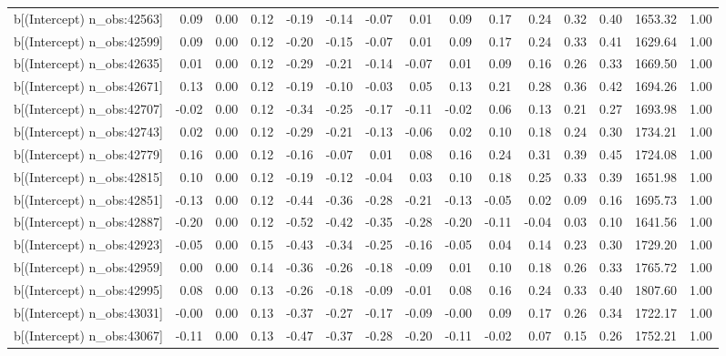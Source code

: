 \begin{table}[ht]
\begin{tabular}{rrrrrrrrrrrrrrr}
  b[(Intercept) n\_obs:42563] & 0.09 & 0.00 & 0.12 & -0.19 & -0.14 & -0.07 & 0.01 & 0.09 & 0.17 & 0.24 & 0.32 & 0.40 & 1653.32 & 1.00 \\ 
  b[(Intercept) n\_obs:42599] & 0.09 & 0.00 & 0.12 & -0.20 & -0.15 & -0.07 & 0.01 & 0.09 & 0.17 & 0.24 & 0.33 & 0.41 & 1629.64 & 1.00 \\ 
  b[(Intercept) n\_obs:42635] & 0.01 & 0.00 & 0.12 & -0.29 & -0.21 & -0.14 & -0.07 & 0.01 & 0.09 & 0.16 & 0.26 & 0.33 & 1669.50 & 1.00 \\ 
  b[(Intercept) n\_obs:42671] & 0.13 & 0.00 & 0.12 & -0.19 & -0.10 & -0.03 & 0.05 & 0.13 & 0.21 & 0.28 & 0.36 & 0.42 & 1694.26 & 1.00 \\ 
  b[(Intercept) n\_obs:42707] & -0.02 & 0.00 & 0.12 & -0.34 & -0.25 & -0.17 & -0.11 & -0.02 & 0.06 & 0.13 & 0.21 & 0.27 & 1693.98 & 1.00 \\ 
  b[(Intercept) n\_obs:42743] & 0.02 & 0.00 & 0.12 & -0.29 & -0.21 & -0.13 & -0.06 & 0.02 & 0.10 & 0.18 & 0.24 & 0.30 & 1734.21 & 1.00 \\ 
  b[(Intercept) n\_obs:42779] & 0.16 & 0.00 & 0.12 & -0.16 & -0.07 & 0.01 & 0.08 & 0.16 & 0.24 & 0.31 & 0.39 & 0.45 & 1724.08 & 1.00 \\ 
  b[(Intercept) n\_obs:42815] & 0.10 & 0.00 & 0.12 & -0.19 & -0.12 & -0.04 & 0.03 & 0.10 & 0.18 & 0.25 & 0.33 & 0.39 & 1651.98 & 1.00 \\ 
  b[(Intercept) n\_obs:42851] & -0.13 & 0.00 & 0.12 & -0.44 & -0.36 & -0.28 & -0.21 & -0.13 & -0.05 & 0.02 & 0.09 & 0.16 & 1695.73 & 1.00 \\ 
  b[(Intercept) n\_obs:42887] & -0.20 & 0.00 & 0.12 & -0.52 & -0.42 & -0.35 & -0.28 & -0.20 & -0.11 & -0.04 & 0.03 & 0.10 & 1641.56 & 1.00 \\ 
  b[(Intercept) n\_obs:42923] & -0.05 & 0.00 & 0.15 & -0.43 & -0.34 & -0.25 & -0.16 & -0.05 & 0.04 & 0.14 & 0.23 & 0.30 & 1729.20 & 1.00 \\ 
  b[(Intercept) n\_obs:42959] & 0.00 & 0.00 & 0.14 & -0.36 & -0.26 & -0.18 & -0.09 & 0.01 & 0.10 & 0.18 & 0.26 & 0.33 & 1765.72 & 1.00 \\ 
  b[(Intercept) n\_obs:42995] & 0.08 & 0.00 & 0.13 & -0.26 & -0.18 & -0.09 & -0.01 & 0.08 & 0.16 & 0.24 & 0.33 & 0.40 & 1807.60 & 1.00 \\ 
  b[(Intercept) n\_obs:43031] & -0.00 & 0.00 & 0.13 & -0.37 & -0.27 & -0.17 & -0.09 & -0.00 & 0.09 & 0.17 & 0.26 & 0.34 & 1722.17 & 1.00 \\ 
  b[(Intercept) n\_obs:43067] & -0.11 & 0.00 & 0.13 & -0.47 & -0.37 & -0.28 & -0.20 & -0.11 & -0.02 & 0.07 & 0.15 & 0.26 & 1752.21 & 1.00 \\ 

\end{tabular}
\end{table}
